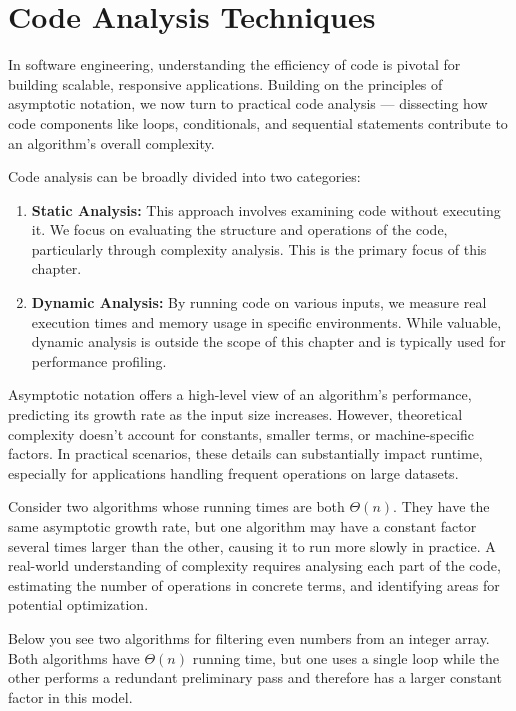 \chapter{Code Analysis Techniques}\label{chap:ch15}

In software engineering, understanding the efficiency of code is pivotal for building scalable, responsive applications. Building on the principles of asymptotic notation, we now turn to practical code analysis — dissecting how code components like loops, conditionals, and sequential statements contribute to an algorithm's overall complexity.

Code analysis can be broadly divided into two categories:

\begin{enumerate}
    \item \textbf{Static Analysis:} This approach involves examining code without executing it. We focus on evaluating the structure and operations of the code, particularly through complexity analysis. This is the primary focus of this chapter.
    \item \textbf{Dynamic Analysis:} By running code on various inputs, we measure real execution times and memory usage in specific environments. While valuable, dynamic analysis is outside the scope of this chapter and is typically used for performance profiling.
\end{enumerate}

Asymptotic notation offers a high-level view of an algorithm's performance, predicting its growth rate as the input size increases. However, theoretical complexity doesn’t account for constants, smaller terms, or machine-specific factors. In practical scenarios, these details can substantially impact runtime, especially for applications handling frequent operations on large datasets.

Consider two algorithms whose running times are both $\Theta(n)$. They have the same asymptotic growth rate, but one algorithm may have a constant factor several times larger than the other, causing it to run more slowly in practice. A real-world understanding of complexity requires analysing each part of the code, estimating the number of operations in concrete terms, and identifying areas for potential optimization.

Below you see two algorithms for filtering even numbers from an integer array. Both algorithms have $\Theta(n)$ running time, but one uses a single loop while the other performs a redundant preliminary pass and therefore has a larger constant factor in this model.


